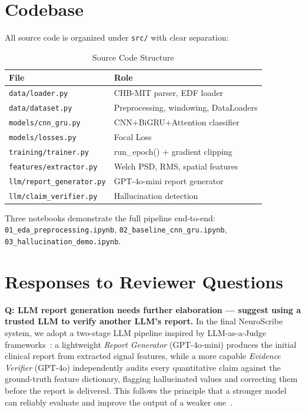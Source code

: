 \documentclass[11pt,twocolumn]{article}
\begin{document}
\section{Codebase}

All source code is organized under \texttt{src/} with clear separation:

\begin{table}[h]
\centering
\caption{Source Code Structure}
\scriptsize
\begin{tabular}{@{}p{3.2cm}p{3.8cm}@{}}
\toprule
\textbf{File} & \textbf{Role} \\
\midrule
\texttt{data/loader.py}      & CHB-MIT parser, EDF loader \\
\texttt{data/dataset.py}     & Preprocessing, windowing, DataLoaders \\
\texttt{models/cnn\_gru.py}  & CNN+BiGRU+Attention classifier \\
\texttt{models/losses.py}    & Focal Loss \\
\texttt{training/trainer.py} & run\_epoch() + gradient clipping \\
\texttt{features/extractor.py} & Welch PSD, RMS, spatial features \\
\texttt{llm/report\_generator.py} & GPT-4o-mini report generator \\
\texttt{llm/claim\_verifier.py}   & Hallucination detection \\
\bottomrule
\end{tabular}
\label{tab:code}
\end{table}

Three notebooks demonstrate the full pipeline end-to-end:
\texttt{01\_eda\_preprocessing.ipynb},
\texttt{02\_baseline\_cnn\_gru.ipynb},
\texttt{03\_hallucination\_demo.ipynb}.

\section{Responses to Reviewer Questions}

\textbf{Q: LLM report generation needs further elaboration — suggest using a
trusted LLM to verify another LLM's report.}
In the final NeuroScribe system, we adopt a two-stage LLM pipeline inspired
by LLM-as-a-Judge frameworks~\cite{zheng2023judging}: a lightweight
\emph{Report Generator} (GPT-4o-mini) produces the initial clinical report
from extracted signal features, while a more capable \emph{Evidence Verifier}
(GPT-4o) independently audits every quantitative claim against the ground-truth
feature dictionary, flagging hallucinated values and correcting them before
the report is delivered. This follows the principle that a stronger model can
reliably evaluate and improve the output of a weaker one~\cite{zheng2023judging}.
\end{document}

